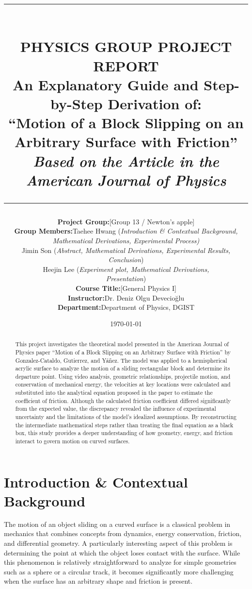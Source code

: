 \documentclass[11pt,letterpaper]{article}
\title{
\vspace{-1.5in}
\rule{\linewidth}{1.5pt} \\ \vspace{4mm}
\large\textbf{PHYSICS GROUP PROJECT REPORT} \\ \vspace{2mm}
\Large\textbf{An Explanatory Guide and Step-by-Step
Derivation of: \\ ``Motion of a Block Slipping on an Arbitrary Surface with Friction''}
\\ \vspace{4mm}
\large\textit{Based on the Article in the American Journal of
Physics} \\
\rule{\linewidth}{1.5pt}
}
\author{
\begin{tabular}{r @{\quad} l}
\textbf{Project Group:} & [Group 13 / Newton's apple] \\[1ex]
\textbf{Group Members:} & Taehee Hwang
(\textit{Introduction \& Contextual Background,} \\
&
\quad \textit{Mathematical Derivations, Experimental Process)} \\
& Jimin Son (\textit{Abstract, Mathematical Derivations, Experimental Results,} \\
&
\quad \textit{Conclusion}) \\
& Heejin Lee (\textit{Experiment plot, Mathematical Derivations,} \\
&
\quad \textit{Presentation}) \\ [1ex]
\textbf{Course Title:}  & {[General Physics I]} \\
\textbf{Instructor:}    & {Dr. Deniz Olgu Devecioğlu} \\
\textbf{Department:}    & {Department of Physics, DGIST}
\end{tabular}
}
\date{\today}
\begin{document}
\maketitle

\begin{abstract}
This project investigates the theoretical model presented in the American Journal of Physics paper “Motion of a Block Slipping on an Arbitrary Surface with Friction” by Gonzalez-Cataldo, Gutierrez, and Yáñez. The model was applied to a hemispherical acrylic surface to analyze the motion of a sliding rectangular block and determine its departure point. Using video analysis, geometric relationships, projectile motion, and conservation of mechanical energy, the velocities at key locations were calculated and substituted into the analytical equation proposed in the paper to estimate the coefficient of friction. Although the calculated friction coefficient differed significantly from the expected value, the discrepancy revealed the influence of experimental uncertainty and the limitations of the model's idealized assumptions. By reconstructing the intermediate mathematical steps rather than treating the final equation as a black box, this study provides a deeper understanding of how geometry, energy, and friction interact to govern motion on curved surfaces.
\end{abstract}
\tableofcontents
\newpage
\section{Introduction \& Contextual Background}
The motion of an object sliding on a curved surface is a classical problem in mechanics that combines concepts from dynamics, energy conservation, friction, and differential geometry. A particularly interesting aspect of this problem is determining the point at which the object loses contact with the surface. While this phenomenon is relatively straightforward to analyze for simple geometries such as a sphere or a circular track, it becomes significantly more challenging when the surface has an arbitrary shape and friction is present.
\end{document}
